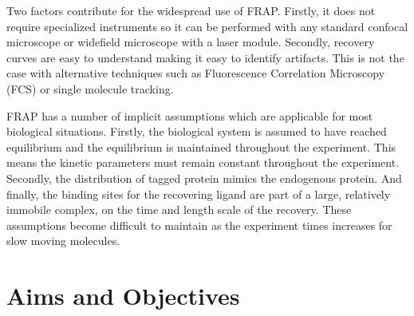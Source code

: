     Two factors contribute for the widespread use of FRAP.
    Firstly, it does not require specialized instruments
    so it can be performed with
    any standard confocal microscope or widefield microscope with a laser
    module.
    Secondly, recovery curves are easy to understand making it easy to
    identify artifacts.  This is not the case with alternative techniques
    such as Fluorescence Correlation Microscopy (FCS) or single molecule
    tracking.

    FRAP has a number of implicit assumptions which are applicable
    for most biological situations.
    Firstly, the biological system is assumed to have
    reached equilibrium and the equilibrium
    is maintained throughout the experiment.
    This means the kinetic parameters
    must remain constant throughout the experiment.
    Secondly, the distribution of tagged protein mimics the endogenous
    protein.
    And finally, the binding sites for the recovering ligand
    are part of a large, relatively immobile
    complex, on the time and length scale of the recovery.
    These assumptions become difficult to maintain as the experiment
    times increases for slow moving molecules.


\section{Aims and Objectives}
